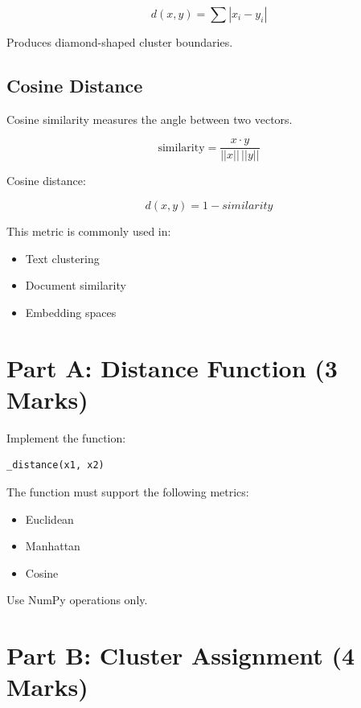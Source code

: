 \documentclass[12pt,a4paper]{article}
\begin{document}
\[
d(x,y) = \sum |x_i - y_i|
\]

Produces diamond-shaped cluster boundaries.

\subsection{Cosine Distance}

Cosine similarity measures the angle between two vectors.

\[
\text{similarity} =
\frac{x \cdot y}{||x||\,||y||}
\]

Cosine distance:

\[
d(x,y) = 1 - similarity
\]

This metric is commonly used in:

\begin{itemize}
\item Text clustering
\item Document similarity
\item Embedding spaces
\end{itemize}


\section{Part A: Distance Function (3 Marks)}

\begin{tcolorbox}

Implement the function:

\begin{verbatim}
_distance(x1, x2)
\end{verbatim}

The function must support the following metrics:

\begin{itemize}
\item Euclidean
\item Manhattan
\item Cosine
\end{itemize}

Use NumPy operations only.

\end{tcolorbox}


\section{Part B: Cluster Assignment (4 Marks)}
\end{document}
